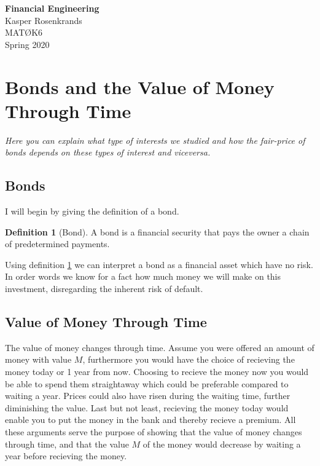 \documentclass{article}
\theoremstyle{definition}
\newtheorem{definition}[theorem]{Definition}
\numberwithin{equation}{section}
\begin{document}
\begin{titlepage}
    \begin{center}
        {\huge\textbf{Financial Engineering}}\\[2mm]
        {\Large Kasper Rosenkrands}\\[2cm]
        {\large MATØK6}\\[2mm]
        {\large Spring 2020}
    \end{center}
    
    \vfill
\end{titlepage}

\section{Bonds and the Value of Money Through Time}
\textit{Here you can explain what type of interests we studied and how the fair-price of bonds depends on these types of interest and viceversa.}

\subsection{Bonds}
I will begin by giving the definition of a bond.
\begin{definition}[Bond]
    A bond is a financial security that pays the owner a chain of predetermined payments.\label{def:bond}
\end{definition}
Using definition \ref{def:bond} we can interpret a bond as a financial asset which have no risk.
In order words we know for a fact how much money we will make on this investment, disregarding the inherent risk of default.

\subsection{Value of Money Through Time}
The value of money changes through time.
Assume you were offered an amount of money with value $M$, furthermore you would have the choice of recieving the money today or 1 year from now.
Choosing to recieve the money now you would be able to spend them straightaway which could be preferable compared to waiting a year.
Prices could also have risen during the waiting time, further diminishing the value.
Last but not least, recieving the money today would enable you to put the money in the bank and thereby recieve a premium.
All these arguments serve the purpose of showing that the value of money changes through time, and that the value $M$ of the money would decrease by waiting a year before recieving the money.
\end{document}
